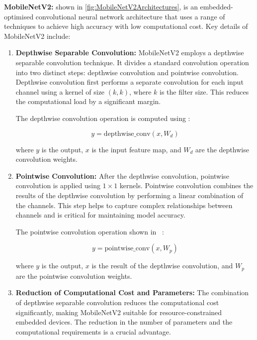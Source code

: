 \noindent\textbf{MobileNetV2:} shown in \ref{fig:MobileNetV2Architectures}, is an embedded-optimised convolutional neural network architecture that uses a range of techniques to achieve high accuracy with low computational cost. Key details of MobileNetV2 include:
\begin{enumerate}

\item  \textbf{Depthwise Separable Convolution:} MobileNetV2 employs a depthwise separable convolution technique. It divides a standard convolution operation into two distinct steps: depthwise convolution and pointwise convolution. Depthwise convolution first performs a separate convolution for each input channel using a kernel of size $(k, k)$, where $k$ is the filter size. This reduces the computational load by a significant margin.

The depthwise convolution operation is computed using :
   
\begin{equation}\label{eq:depthwise}
y = \text{depthwise\_conv}(x, W_{d})
\end{equation}
   
where $y$ is the output, $x$ is the input feature map, and $W_{d}$ are the depthwise convolution weights.

\item \textbf{Pointwise Convolution:} After the depthwise convolution, pointwise convolution is applied using $1\times1$ kernels. Pointwise convolution combines the results of the depthwise convolution by performing a linear combination of the channels. This step helps to capture complex relationships between channels and is critical for maintaining model accuracy.

The pointwise convolution operation shown in  ~:
   
\begin{equation}\label{eq:Pointwise}
y = \text{pointwise\_conv}(x, W_{p})
\end{equation}

where $y$ is the output, $x$ is the result of the depthwise convolution, and $W_{p}$ are the pointwise convolution weights.

\item \textbf{Reduction of Computational Cost and Parameters:} The combination of depthwise separable convolution reduces the computational cost significantly, making MobileNetV2 suitable for resource-constrained embedded devices. The reduction in the number of parameters and the computational requirements is a crucial advantage.


\end{enumerate}
